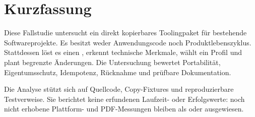 \section{Kurzfassung}
\label{chap:abstract}

Diese Fallstudie untersucht ein direkt kopierbares Toolingpaket für bestehende
Softwareprojekte. Es besitzt weder Anwendungscode noch Produktlebenszyklus. Stattdessen
löst es einen \ProjectContext{}, erkennt technische Merkmale, wählt ein Profil und plant
begrenzte Änderungen. Die Untersuchung bewertet Portabilität, Eigentumsschutz,
Idempotenz, Rücknahme und prüfbare Dokumentation.

Die Analyse stützt sich auf Quellcode, Copy-Fixtures und reproduzierbare Testverweise.
Sie berichtet keine erfundenen Laufzeit- oder Erfolgswerte: noch nicht erhobene
Plattform- und PDF-Messungen bleiben als \Planned{} oder \Limitation{} ausgewiesen.
